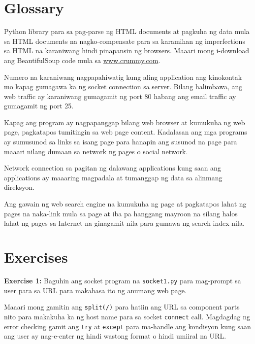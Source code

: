 \documentclass[10pt,]{book}
\providecommand{\tightlist}{%
  \setlength{\itemsep}{0pt}\setlength{\parskip}{0pt}}
\begin{document}
\section{Glossary}\label{glossary-11}

\begin{description}
\tightlist
\item[BeautifulSoup]
Python library para sa pag-parse ng HTML documents at pagkuha ng data
mula sa HTML documents na nagko-compensate para sa karamihan ng
imperfections sa HTML na karaniwang hindi pinapansin ng browsers. Maaari
mong i-download ang BeautifulSoup code mula sa
\href{http://www.crummy.com}{www.crummy.com}. 
\item[port]
Numero na karaniwang nagpapahiwatig kung aling application ang
kinokontak mo kapag gumagawa ka ng socket connection sa server. Bilang
halimbawa, ang web traffic ay karaniwang gumagamit ng port 80 habang ang
email traffic ay gumagamit ng port 25. 
\item[scrape]
Kapag ang program ay nagpapanggap bilang web browser at kumukuha ng web
page, pagkatapos tumitingin sa web page content. Kadalasan ang mga
programs ay sumusunod sa links sa isang page para hanapin ang susunod na
page para maaari nilang dumaan sa network ng pages o social network.
\item[socket]
Network connection sa pagitan ng dalawang applications kung saan ang
applications ay maaaring magpadala at tumanggap ng data sa alinmang
direksyon. 
\item[spider]
Ang gawain ng web search engine na kumukuha ng page at pagkatapos lahat
ng pages na naka-link mula sa page at iba pa hanggang mayroon na silang
halos lahat ng pages sa Internet na ginagamit nila para gumawa ng search
index nila. 
\end{description}

\section{Exercises}\label{exercises-11}

\textbf{Exercise 1:} Baguhin ang socket program na \texttt{socket1.py}
para mag-prompt sa user para sa URL para makabasa ito ng anumang web
page.

Maaari mong gamitin ang
\texttt{split(\textquotesingle{}/\textquotesingle{})} para hatiin ang
URL sa component parts nito para makakuha ka ng host name para sa socket
\texttt{connect} call. Magdagdag ng error checking gamit ang
\texttt{try} at \texttt{except} para ma-handle ang kondisyon kung saan
ang user ay nag-e-enter ng hindi wastong format o hindi umiiral na URL.
\end{document}
